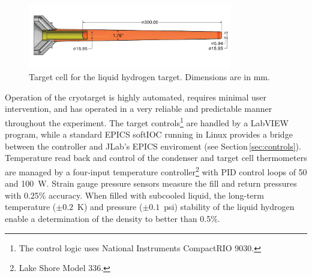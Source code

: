 \begin{figure}
\includegraphics[width=3.5in]{figures/GluexCell_mm.pdf}
\caption{Target cell for the liquid hydrogen target.  Dimensions are in mm.  }
\label{fig:TargetCell}
\end{figure}

Operation of the cryotarget is highly automated, requires minimal user intervention,
and has operated in a very reliable and predictable manner throughout the
experiment. 
The target controls\footnote{The control logic uses National Instruments CompactRIO 9030.} are handled by a LabVIEW program, 
while a standard EPICS softIOC running in Linux provides a
bridge between the controller and JLab's EPICS enviroment (see Section\,\ref{sec:controls}).     
Temperature read back and control of the condenser and target cell thermometers
are managed by a four-input temperature
controller\footnote{Lake Shore Model 336.} with PID control loops of 50 and 100~W.
Strain gauge pressure sensors measure the fill and return pressures with 0.25\% 
accuracy.  When filled with subcooled liquid, 
the long-term temperature ($\pm 0.2$~K) and pressure ($\pm 0.1$~psi)
stability of the liquid hydrogen enable a determination of the density to better than 0.5\%.


